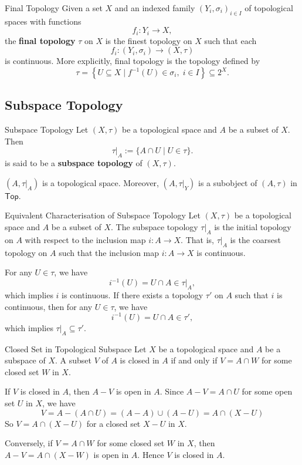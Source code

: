 \documentclass{report}
\newcommand{\Top}{\mathsf{Top}}
\begin{document}
\begin{definition}{Final Topology}{}
	Given a set $X$ and an indexed family $\left(Y_i, \sigma_i\right)_{i \in I}$ of topological spaces with functions
	$$
	f_i: Y_i \rightarrow X,
	$$
	the \textbf{final topology} $\tau$ on $X$ is the finest topology on $X$ such that each
	$$
	f_i:(Y_i, \sigma_i) \rightarrow (X, \tau)
	$$
	is continuous. More explicitly, final topology is the topology defined by
	\[
		\tau=\left\{ U\subseteq X \mid f^{-1}(U)\in \sigma_i, \;i \in I \right\}\subseteq 2^X.
	\]
\end{definition}

\subsection{Subspace Topology}
\begin{definition}{Subspace Topology}{}
	Let $(X,\tau)$ be a topological space and $A$ be a subset of $X$. Then
	\[
		\tau |_A:=\{A\cap U\mid U\in \tau\}.
	\]
	is said to be a \textbf{subspace topology} of $(X,\tau)$.
\end{definition}

$(A,\tau |_A)$ is a topological space. Moreover, $(A,\tau |_Y)$ is a subobject of $(A,\tau)$ in $\Top$.


\begin{proposition}{Equivalent Characterisation of Subspace Topology}{}
	Let $(X,\tau)$ be a topological space and $A$ be a subset of $X$. The subspace topology $\tau |_A$ is the initial topology on $A$ with respect to the inclusion map $i:A\to X$. That is, $\tau |_A$ is the coarsest topology on $A$ such that the inclusion map $i:A\to X$ is continuous.
\end{proposition}

\begin{prf}
	For any $U\in \tau$, we have
	\[
		i^{-1}(U)=U\cap A\in \tau|_A,
	\]
	which implies $i$ is continuous. If there exists a topology $\tau'$ on $A$ such that $i$ is continuous, then for any $U\in \tau$, we have
	\[
		i^{-1}(U)=U\cap A\in \tau',
	\]
	which implies $\tau|_A\subseteq \tau'$.
\end{prf}

\begin{proposition}{Closed Set in Topological Subspace}{}
	Let $X$ be a topological space and $A$ be a subspace of $X$. A subset $V$ of $A$ is closed in $A$ if and only if $V=A\cap W$ for some closed set $W$ in $X$.
\end{proposition}
\begin{prf}
	If $V$ is closed in $A$, then $A-V$ is open in $A$. Since $A-V=A\cap U$ for some open set $U$ in $X$, we have 
	\[
		V=A-\left(A\cap U\right)=(A-A)\cup \left(A-U\right)=A\cap (X-U)
	\]
	So $V=A\cap (X-U)$ for a closed set $X-U$ in $X$.

	Conversely, if $V=A\cap W$ for some closed set $W$ in $X$, then $A-V=A\cap (X-W)$ is open in $A$. Hence $V$ is closed in $A$.
\end{prf}
\end{document}
